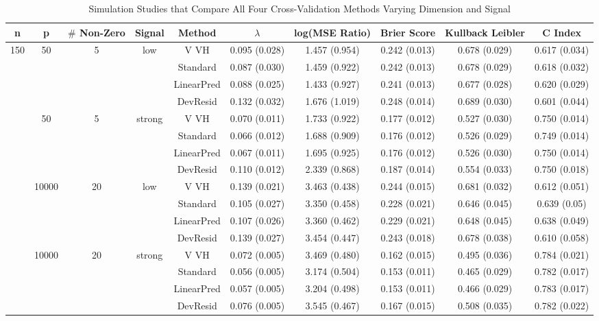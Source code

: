 \begin{table}[h]

\setlength{\tabcolsep}{3pt}

\caption{\label{tab:} Simulation Studies that Compare All Four Cross-Validation Methods Varying Dimension and Signal }
\centering
\begin{tabular}[t]{cccccccccc}
\toprule
 n& p& $\#$ Non-Zero & Signal & Method & $\lambda$ & log(MSE Ratio) &Brier Score & Kullback Leibler & C Index\\
\midrule
150 & 50 & 5 & low & V VH  & 0.095 (0.028) & 1.457 (0.954) & 0.242 (0.013) & 0.678 (0.029) & 0.617 (0.034) \\
    &    &   &     & Standard  & 0.087 (0.030) & 1.459 (0.922) & 0.242 (0.013) & 0.678 (0.029) & 0.618 (0.032) \\
    &    &   &     & LinearPred  & 0.088 (0.025) & 1.433 (0.927) & 0.241 (0.013) & 0.677 (0.028) & 0.620 (0.029) \\
    &    &   &     & DevResid  & 0.132 (0.032) & 1.676 (1.019) & 0.248 (0.014) & 0.689 (0.030) & 0.601 (0.044) \\
\addlinespace
150 & 50 & 5 & strong & V VH  & 0.070 (0.011) & 1.733 (0.922) & 0.177 (0.012) & 0.527 (0.030) & 0.750 (0.014) \\
    &    &   &     & Standard  & 0.066 (0.012) & 1.688 (0.909) & 0.176 (0.012) & 0.526 (0.029) & 0.749 (0.014) \\
    &    &   &     & LinearPred  & 0.067 (0.011) & 1.695 (0.925) & 0.176 (0.012) & 0.526 (0.030) & 0.750 (0.014) \\
    &    &   &     & DevResid  & 0.110 (0.012) & 2.339 (0.868) & 0.187 (0.014) & 0.554 (0.033) & 0.750 (0.018) \\
\addlinespace
300 & 10000 & 20 & low & V VH  & 0.139 (0.021) & 3.463 (0.438) & 0.244 (0.015) & 0.681 (0.032) & 0.612 (0.051) \\
    &    &   &     & Standard  & 0.105 (0.027) & 3.350 (0.458) & 0.228 (0.021) & 0.646 (0.045) & 0.639 (0.05) \\
    &    &   &     & LinearPred  & 0.107 (0.026) & 3.360 (0.462) & 0.229 (0.021) & 0.648 (0.045) & 0.638 (0.049) \\
    &    &   &     & DevResid  & 0.139 (0.027) & 3.454 (0.447) & 0.243 (0.018) & 0.678 (0.038) & 0.610 (0.058) \\
\addlinespace
500 & 10000 & 20 & strong & V VH  & 0.072 (0.005) & 3.469 (0.480) & 0.162 (0.015) & 0.495 (0.036) & 0.784 (0.021) \\
    &    &   &     & Standard  & 0.056 (0.005) & 3.174 (0.504) & 0.153 (0.011) & 0.465 (0.029) & 0.782 (0.017) \\
    &    &   &     & LinearPred  & 0.057 (0.005) & 3.204 (0.498) & 0.153 (0.011) & 0.466 (0.029) & 0.783 (0.017) \\
    &    &   &     & DevResid  & 0.076 (0.005) & 3.545 (0.467) & 0.167 (0.015) & 0.508 (0.035) & 0.782 (0.022) \\
\bottomrule
\end{tabular}
\end{table}

